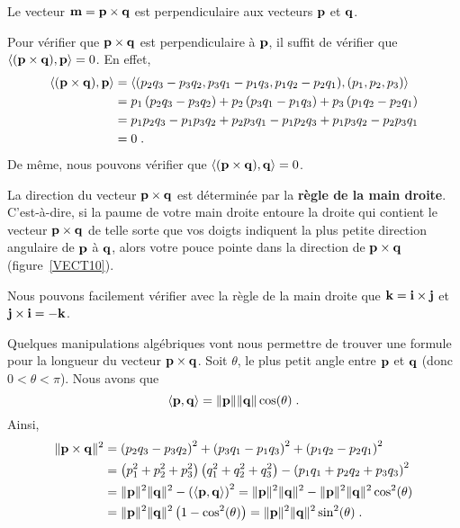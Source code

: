 {\begin{focus}{\prp}
Le vecteur $\mathbf{m} = \mathbf{p} \times \mathbf{q}$ est
perpendiculaire aux vecteurs $\mathbf{p}$ et $\mathbf{q}$.
\end{focus}

Pour vérifier que $\mathbf{p} \times \mathbf{q}$ est perpendiculaire à
$\mathbf{p}$, il suffit de vérifier que
$\left\langle{(\mathbf{p} \times \mathbf{q})} , {\mathbf{p}}\right\rangle = 0$.  En effet,
\begin{align*}
\left\langle{(\mathbf{p} \times \mathbf{q})} , {\mathbf{p}}\right\rangle &=
\left\langle{ \left(p_2 q_3 - p_3 q_2, p_3 q_1 - p_1 q_3,
p_1 q_2 - p_2 q_1\right)} , {(p_1,p_2,p_3)}\right\rangle \\
&= p_1\left(p_2 q_3 - p_3 q_2\right) + p_2\left(p_3 q_1 - p_1 q_3\right)
+ p_3\left(p_1 q_2 - p_2 q_1\right) \\
&= p_1 p_2 q_3 - p_1 p_3 q_2 + p_2 p_3 q_1 - p_1 p_2 q_3
+ p_1 p_3 q_2 - p_2 p_3 q_1 \\
&= 0 \; .
\end{align*}
De même, nous pouvons vérifier que
$\left\langle{(\mathbf{p} \times \mathbf{q})} , {\mathbf{q}}\right\rangle = 0$.

\begin{focus}{\dfn} 
La direction du vecteur $\mathbf{p} \times \mathbf{q}$ est déterminée par la
{\bfseries règle de la main droite}.  C'est-à-dire, si la paume de
votre main droite entoure la droite qui contient le vecteur
$\mathbf{p} \times \mathbf{q}$ de telle sorte que vos doigts indiquent la
plus petite direction angulaire de $\mathbf{p}$ à $\mathbf{q}$, alors votre
pouce pointe dans la direction de $\mathbf{p} \times \mathbf{q}$
(figure~\ref{VECT10}).
\end{focus}


\begin{egg}
Nous pouvons facilement vérifier avec la règle de la main droite que
$\mathbf{k} = \mathbf{i} \times \mathbf{j}$ et $\mathbf{j} \times \mathbf{i} = -\mathbf{k}$.
\end{egg}

Quelques manipulations algébriques vont nous permettre de trouver une
formule pour la longueur du vecteur $\mathbf{p} \times \mathbf{q}$.
Soit $\theta$, le plus petit angle entre $\mathbf{p}$ et $\mathbf{q}$
(donc $0 < \theta < \pi$).  Nous avons que
\[
\left\langle{\mathbf{p}} , {\mathbf{q}}\right\rangle = \|\mathbf{p}\| \|\mathbf{q}\| \cos(\theta)  \; .
\]
Ainsi,
\begin{align*}
\| \mathbf{p} \times \mathbf{q} \|^2 &= 
\left(p_2 q_3 - p_3 q_2\right)^2 + \left(p_3 q_1 - p_1 q_3\right)^2
+ \left(p_1 q_2 - p_2 q_1\right)^2 \\
&= \left(p_1^2+p_2^2+p_3^2\right)\left(q_1^2+q_2^2+q_3^2\right)
-\left(p_1q_1+p_2q_2+p_3q_3\right)^2 \\
&= \|\mathbf{p}\|^2 \|\mathbf{q}\|^2
- \left( \left\langle{\mathbf{p}} , {\mathbf{q}}\right\rangle \right)^2
= \|\mathbf{p}\|^2 \|\mathbf{q}\|^2
- \|\mathbf{p}\|^2 \|\mathbf{q}\|^2\cos^2(\theta) \\
&= \|\mathbf{p}\|^2 \|\mathbf{q}\|^2 \left( 1 - \cos^2(\theta)\right)
= \|\mathbf{p}\|^2 \|\mathbf{q}\|^2 \sin^2(\theta) \; .
\end{align*}

}
